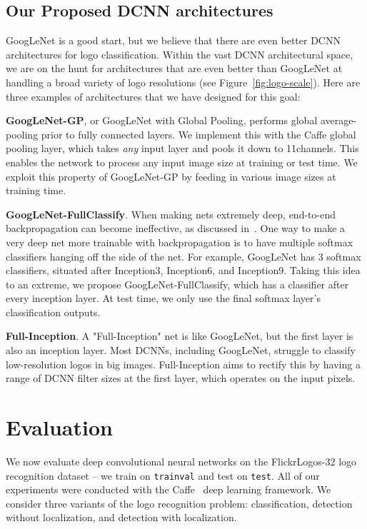 \documentclass{bmvc2k}
\begin{document}
\subsection{Our Proposed DCNN architectures}
\vspace{-0.1in}
GoogLeNet is a good start, but we believe that there are even better DCNN architectures for logo classification.
Within the vast DCNN architectural space, we are on the hunt for architectures that are even better than GoogLeNet at handling a broad variety of logo resolutions (see Figure~\ref{fig:logo-scale}).
Here are three examples of architectures that we have designed for this goal:

{\bf GoogLeNet-GP}, or GoogLeNet with Global Pooling, performs global average-pooling prior to fully connected layers. 
We implement this with the Caffe global pooling layer, which takes {\em any} input layer and pools it down to 11channels.
This enables the network to process any input image size at training or test time.
We exploit this property of GoogLeNet-GP by feeding in various image sizes at training time.


{\bf GoogLeNet-FullClassify}. 
When making nets extremely deep, end-to-end backpropagation can become ineffective, as discussed in~\cite{VGG-19}.
One way to make a very deep net more trainable with backpropagation is to have multiple softmax classifiers hanging off the side of the net.
For example, GoogLeNet has 3 softmax classifiers, situated after Inception3, Inception6, and Inception9.
Taking this idea to an extreme, we propose GoogLeNet-FullClassify, which has a classifier after every inception layer.
At test time, we only use the final softmax layer's classification outputs.

{\bf Full-Inception}. 
A "Full-Inception" net is like GoogLeNet, but the first layer is also an inception layer.
Most DCNNs, including GoogLeNet, struggle to classify low-resolution logos in big images.
Full-Inception aims to rectify this by having a range of DCNN filter sizes at the first layer, which operates on the input pixels.

\section{Evaluation}
\vspace{-0.1in}
\label{sec:eval}

We now evaluate deep convolutional neural networks on the FlickrLogos-32 logo recognition dataset -- we train on {\tt trainval} and test on {\tt test}. 
All of our experiments were conducted with the Caffe~\cite{jia2014caffe} deep learning framework. 
We consider three variants of the logo recognition problem: classification, detection without localization, and detection with localization.
\end{document}
